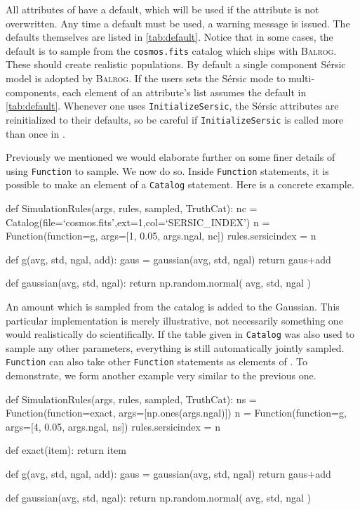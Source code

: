 \documentclass[11pt]{book}
\newcommand{\codett}[1]{\texttt{#1}}
\newcommand{\balrog}{\textsc{Balrog}}
\newcommand{\sersic}{S\'{e}rsic}
\begin{document}
All attributes of \simrules{} have a default, which will be used if the attribute is not overwritten.
Any time a default must be used, a warning message is issued.
The defaults themselves are listed in \autoref{tab:default}.
Notice that in some cases, the default is to sample from the \codett{cosmos.fits} catalog which
ships with \balrog{}.
These should create realistic populations.
By default a single component \sersic{} model is adopted by \balrog{}.
If the users sets the \sersic{} mode to multi-components, each element of an attribute's list assumes the default in \autoref{tab:default}.
Whenever one uses \codett{InitializeSersic}, the \sersic{} attributes 
are reinitialized to their defaults, so be careful if \codett{InitializeSersic} is called more than once
in \simfunc{}.



Previously we mentioned we would elaborate further on some finer details of using \codett{Function} to sample.
We now do so.
Inside \codett{Function} statements, it is possible to make an element of \simargs{} a \codett{Catalog} statement.
Here is a concrete example.

\begin{code}
def SimulationRules(args, rules, sampled, TruthCat):
    nc = Catalog(file=`cosmos.fits',ext=1,col=`SERSIC_INDEX')
    n = Function(function=g, args=[1, 0.05, args.ngal, nc])
    rules.sersicindex = n

def g(avg, std, ngal, add):
    gaus = gaussian(avg, std, ngal)
    return gaus+add

def gaussian(avg, std, ngal):
    return np.random.normal( avg, std, ngal )
\end{code}

\noindent An amount which is sampled from the catalog is added to the Gaussian.
This particular implementation is merely illustrative, not necessarily
something one would realistically do scientifically.
If the table given in \codett{Catalog} was also used to sample any other parameters,
everything is still automatically jointly sampled.
\codett{Function} can also take other \codett{Function} statements as elements of \simargs{}.
To demonstrate, we form another example very similar to the previous one.

\begin{code}
def SimulationRules(args, rules, sampled, TruthCat):
    ns = Function(function=exact, args=[np.ones(args.ngal)])
    n = Function(function=g, args=[4, 0.05, args.ngal, ns])
    rules.sersicindex = n

def exact(item):
    return item

def g(avg, std, ngal, add):
    gaus = gaussian(avg, std, ngal)
    return gaus+add

def gaussian(avg, std, ngal):
    return np.random.normal( avg, std, ngal )
\end{code}
\end{document}
